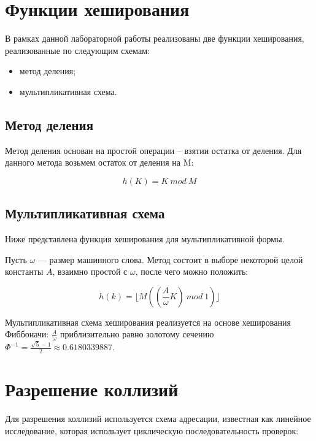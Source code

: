 \section{Функции хеширования}

В рамках данной лабораторной работы реализованы две функции хеширования, реализованные по следующим схемам:

\begin{itemize}[$\bullet$]
    \item метод деления;
    \item мультипликативная схема.
\end{itemize}

\subsection{Метод деления}

Метод деления основан на простой операции -- взятии остатка от деления. Для данного метода возьмем остаток от деления на M:

\begin{equation}
    h(K) = K~mod~M
\end{equation}

\subsection{Мультипликативная схема}

Ниже представлена функция хеширования для мультипликативной формы.

Пусть $\omega$ --- размер машинного слова. Метод состоит в выборе некоторой целой константы $A$, взаимно простой с $\omega$, после чего можно положить: 

\begin{equation}
    h(k) = \lfloor M\left(\left(\frac{A}{\omega}K\right)~mod~1\right) \rfloor
\end{equation}

Мультипликативная схема хеширования реализуется на основе хеширования Фиббоначи: $\frac{A}{\omega}$ приблизительно равно золотому сечению $\Phi^{-1} = \frac{\sqrt{5} - 1}{2} \approx 0.6180339887$.

\section{Разрешение коллизий}

Для разрешения коллизий используется схема адресации, известная как линейное исследование, которая использует циклическую последовательность проверок:

